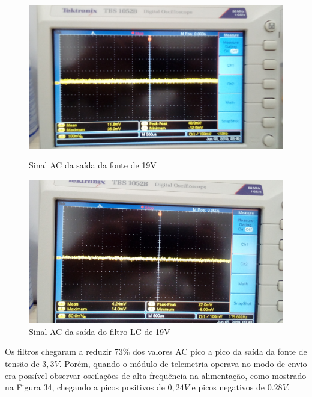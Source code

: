 \documentclass[11pt]{abntex2}
\begin{document}
					\begin{figure}[!ht]
						\centering
						\begin{minipage}{0.4\linewidth}
							\centering
							\includegraphics[width = \linewidth]{../Fotos/antesFiltro19.jpg}
							\caption{Sinal AC da saída da fonte de 19V}
						\end{minipage}
						\hfill\vline\hfill
						\begin{minipage}{0.4\linewidth}
							\centering
							\includegraphics[width = \linewidth]{../Fotos/depoisFiltro19.jpg}
							\caption{Sinal AC da saída do filtro LC de 19V}
						\end{minipage}
					\end{figure}

					Os filtros chegaram a reduzir 73\% dos valores AC pico a
					pico da saída da fonte de tensão de $3,3V$. Porém, quando o
					módulo de telemetria operava no modo de envio era possível
					observar oscilações de alta frequência na alimentação, como
					mostrado na Figura 34, chegando a picos positivos de $0,24V$
					e picos negativos de $0.28V$.
					
\end{document}
